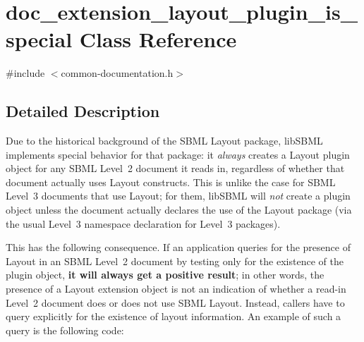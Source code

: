 \hypertarget{classdoc__extension__layout__plugin__is__special}{}\section{doc\+\_\+extension\+\_\+layout\+\_\+plugin\+\_\+is\+\_\+special Class Reference}
\label{classdoc__extension__layout__plugin__is__special}


{\ttfamily \#include $<$common-\/documentation.\+h$>$}



\subsection{Detailed Description}
\begin{DoxyParagraph}{}
Due to the historical background of the S\+B\+ML Layout package, lib\+S\+B\+ML implements special behavior for that package\+: it {\itshape always} creates a Layout plugin object for any S\+B\+ML Level~2 document it reads in, regardless of whether that document actually uses Layout constructs. This is unlike the case for S\+B\+ML Level~3 documents that use Layout; for them, lib\+S\+B\+ML will {\itshape not} create a plugin object unless the document actually declares the use of the Layout package (via the usual Level~3 namespace declaration for Level~3 packages).
\end{DoxyParagraph}
This has the following consequence. If an application queries for the presence of Layout in an S\+B\+ML Level~2 document by testing only for the existence of the plugin object, {\bfseries it will always get a positive result}; in other words, the presence of a Layout extension object is not an indication of whether a read-\/in Level~2 document does or does not use S\+B\+ML Layout. Instead, callers have to query explicitly for the existence of layout information. An example of such a query is the following code\+:

